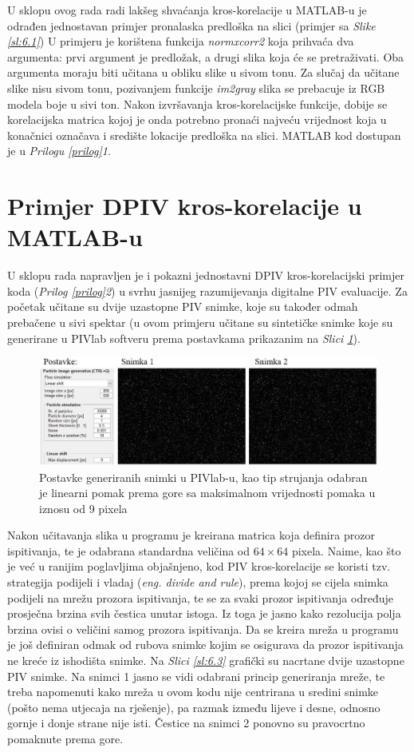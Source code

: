 U sklopu ovog rada radi lakšeg shvaćanja kros-korelacije u MATLAB-u je odrađen jednostavan primjer pronalaska predloška na slici (primjer sa \textit{Slike \ref{sl:6.1}}) U primjeru je korištena funkcija \textit{normxcorr2} koja prihvaća dva argumenta: prvi argument je predložak, a drugi slika koja će se pretraživati. Oba argumenta moraju biti učitana u obliku slike u sivom tonu. Za slučaj da učitane slike nisu sivom tonu, pozivanjem funkcije \textit{im2gray} slika se prebacuje iz RGB modela boje u sivi ton. Nakon izvršavanja kros-korelacijske funkcije, dobije se korelacijska matrica kojoj je onda potrebno pronaći najveću vrijednost koja u konačnici označava i središte lokacije predloška na slici. MATLAB kod dostupan je u \textit{Prilogu \ref{prilog}1}.
\FloatBarrier
\section{Primjer DPIV kros-korelacije u MATLAB-u}
\label{PIVkod}
U sklopu rada napravljen je i pokazni jednostavni DPIV kros-korelacijski primjer koda (\textit{Prilog \ref{prilog}2}) u svrhu jasnijeg razumijevanja digitalne PIV evaluacije. Za početak učitane su dvije uzastopne PIV snimke, koje su također odmah prebačene u sivi spektar (u ovom primjeru učitane su sintetičke snimke koje su generirane u PIVlab softveru prema postavkama prikazanim na \textit{Slici \ref{sl:6.2}}).
\begin{figure}[h]  
	\centering
	\includegraphics[width=16cm]{./6_PrimjerKrosKorelacije/slika6_2.jpg} 
	\caption{Postavke generiranih snimki u PIVlab-u, kao tip strujanja odabran je linearni pomak prema gore sa maksimalnom vrijednosti pomaka u iznosu od 9 pixela}
	\label{sl:6.2}
\end{figure}
\par
Nakon učitavanja slika u programu je kreirana matrica koja definira prozor ispitivanja, te je odabrana standardna veličina od $64\times 64$ pixela. Naime, kao što je već u ranijim poglavljima objašnjeno, kod PIV kros-korelacije se koristi tzv. strategija podijeli i vladaj (\textit{eng. divide and rule}), prema kojoj se cijela snimka podijeli na mrežu prozora ispitivanja, te se za svaki prozor ispitivanja određuje prosječna brzina svih čestica unutar istoga. Iz toga je jasno kako rezolucija polja brzina ovisi o veličini samog prozora ispitivanja. Da se kreira mreža u programu je još definiran odmak od rubova snimke kojim se osigurava da prozor ispitivanja ne kreće iz ishodišta snimke. Na \textit{Slici \ref{sl:6.3}} grafički su nacrtane dvije uzastopne PIV snimke. Na snimci 1 jasno se vidi odabrani princip generiranja mreže, te treba napomenuti kako mreža u ovom kodu nije centrirana u sredini snimke (pošto nema utjecaja na rješenje), pa razmak između lijeve i desne, odnosno gornje i donje strane nije isti. Čestice na snimci 2 ponovno su pravocrtno pomaknute prema gore.
